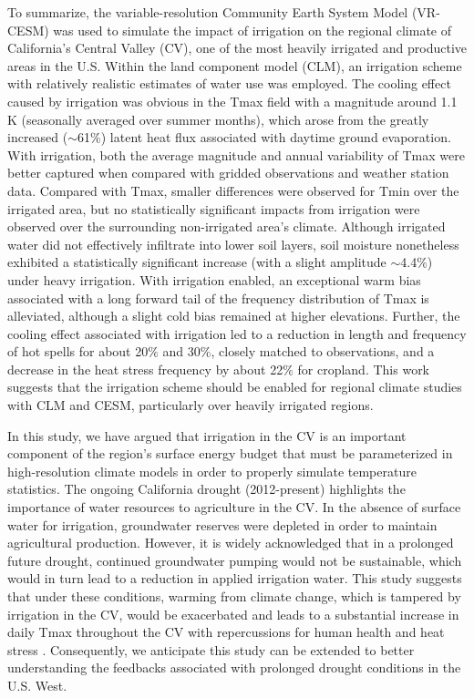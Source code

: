 \documentclass[draft,ms]{agutex}   %
\begin{document}
\begin{article}
To summarize, the variable-resolution Community Earth System Model (VR-CESM) was used to simulate the impact of irrigation on the regional climate of California's Central Valley (CV), one of the most heavily irrigated and productive areas in the U.S. Within the land component model (CLM), an irrigation scheme with relatively realistic estimates of water use was employed. The cooling effect caused by irrigation was obvious in the Tmax field with a magnitude around 1.1 K (seasonally averaged over summer months), which arose from the greatly increased ($\sim$61$\%$) latent heat flux associated with daytime ground evaporation. With irrigation, both the average magnitude and annual variability of Tmax were better captured when compared with gridded observations and weather station data. Compared with Tmax, smaller differences were observed for Tmin over the irrigated area, but no statistically significant impacts from irrigation were observed over the surrounding non-irrigated area's climate. Although irrigated water did not effectively infiltrate into lower soil layers, soil moisture nonetheless exhibited a statistically significant increase (with a slight amplitude $\sim$4.4$\%$) under heavy irrigation. With irrigation enabled, an exceptional warm bias associated with a long forward tail of the frequency distribution of Tmax is alleviated, although a slight cold bias remained at higher elevations. Further, the cooling effect associated with irrigation led to a reduction in length and frequency of hot spells for about 20$\%$ and 30$\%$, closely matched to observations, and a decrease in the heat stress frequency by about 22$\%$ for cropland. This work suggests that the irrigation scheme should be enabled for regional climate studies with CLM and CESM, particularly over heavily irrigated regions.

In this study, we have argued that irrigation in the CV is an important component of the region's surface energy budget that must be parameterized in high-resolution climate models in order to properly simulate temperature statistics. The ongoing California drought (2012-present) highlights the importance of water resources to agriculture in the CV. In the absence of surface water for irrigation, groundwater reserves were depleted in order to maintain agricultural production.  However, it is widely acknowledged that in a prolonged future drought, continued groundwater pumping would not be sustainable, which would in turn lead to a reduction in applied irrigation water.  This study suggests that under these conditions, warming from climate change, which is tampered by irrigation in the CV, would be exacerbated and leads to a substantial increase in daily Tmax throughout the CV with repercussions for human health and heat stress \citep{williams2015contribution}. Consequently, we anticipate this study can be extended to better understanding the feedbacks associated with prolonged drought conditions in the U.S. West.


\end{article}
\end{document}

